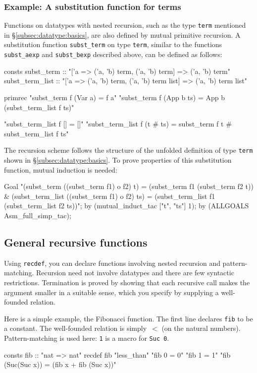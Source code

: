 \subsubsection{Example: A substitution function for terms}
Functions on datatypes with nested recursion, such as the type
{\tt term} mentioned in \S\ref{subsec:datatype:basics}, are
also defined by mutual primitive recursion. A substitution
function {\tt subst_term} on type {\tt term}, similar to the functions
{\tt subst_aexp} and {\tt subst_bexp} described above, can
be defined as follows:
\begin{ttbox}
consts
  subst_term :: "['a => ('a, 'b) term, ('a, 'b) term] => ('a, 'b) term"
  subst_term_list ::
    "['a => ('a, 'b) term, ('a, 'b) term list] => ('a, 'b) term list"

primrec
  "subst_term f (Var a) = f a"
  "subst_term f (App b ts) = App b (subst_term_list f ts)"

  "subst_term_list f [] = []"
  "subst_term_list f (t # ts) =
     subst_term f t # subst_term_list f ts"
\end{ttbox}
The recursion scheme follows the structure of the unfolded definition of type
{\tt term} shown in \S\ref{subsec:datatype:basics}. To prove properties of
this substitution function, mutual induction is needed:
\begin{ttbox}
Goal
  "(subst_term ((subst_term f1) o f2) t) =
     (subst_term f1 (subst_term f2 t)) &
   (subst_term_list ((subst_term f1) o f2) ts) =
     (subst_term_list f1 (subst_term_list f2 ts))";
by (mutual_induct_tac ["t", "ts"] 1);
by (ALLGOALS Asm_full_simp_tac);
\end{ttbox}



\subsection{General recursive functions}
\label{sec:HOL:recdef}

Using \texttt{recdef}, you can declare functions involving nested recursion
and pattern-matching.  Recursion need not involve datatypes and there are few
syntactic restrictions.  Termination is proved by showing that each recursive
call makes the argument smaller in a suitable sense, which you specify by
supplying a well-founded relation.

Here is a simple example, the Fibonacci function.  The first line declares
\texttt{fib} to be a constant.  The well-founded relation is simply~$<$ (on
the natural numbers).  Pattern-matching is used here: \texttt{1} is a
macro for \texttt{Suc~0}.
\begin{ttbox}
consts fib  :: "nat => nat"
recdef fib "less_than"
    "fib 0 = 0"
    "fib 1 = 1"
    "fib (Suc(Suc x)) = (fib x + fib (Suc x))"
\end{ttbox}

